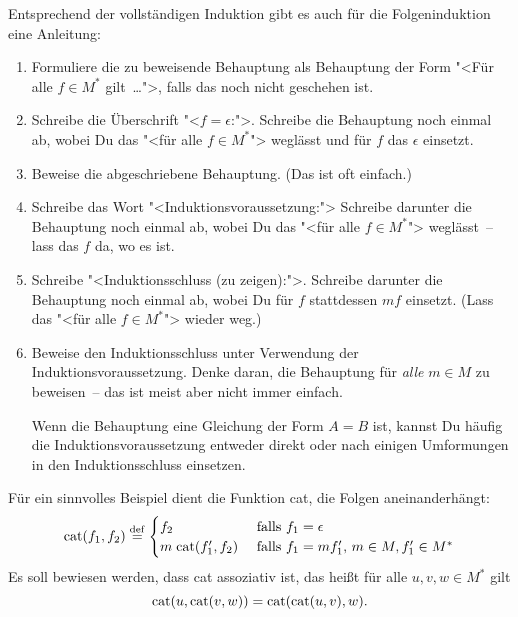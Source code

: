 Entsprechend der vollständigen Induktion gibt es auch für die
Folgeninduktion eine Anleitung:
%
\begin{enumerate}
\item Formuliere die zu beweisende Behauptung als Behauptung der
  Form "<Für alle $f\in M^\ast$ gilt~\ldots">, falls das noch nicht
  geschehen ist.
\item Schreibe die Überschrift "<$f = \epsilon$:">. Schreibe die
  Behauptung noch einmal ab, wobei Du das "<für alle $f\in M^\ast$"> weglässt und für $f$ das $\epsilon$ einsetzt.
\item Beweise die abgeschriebene Behauptung.  (Das ist oft
  einfach.)
\item Schreibe das Wort "<Induktionsvoraussetzung:"> Schreibe
  darunter die Behauptung noch einmal ab, wobei Du das "<für
  alle $f\in M^\ast$"> weglässt~-- lass das $f$ da, wo es ist.
\item Schreibe "<Induktionsschluss (zu zeigen):">.
  Schreibe darunter die Behauptung noch einmal ab, wobei Du für
  $f$ stattdessen $mf$ einsetzt.  (Lass das "<für alle
  $f\in M^\ast$"> wieder weg.)
\item Beweise den Induktionsschluss unter Verwendung der
  Induktionsvoraussetzung.  Denke daran, die Behauptung für
  \emph{alle} $m\in M$ zu beweisen~-- das ist meist aber nicht immer
  einfach.

  Wenn die Behauptung eine Gleichung der Form $A = B$ ist, kannst
  Du häufig die Induktionsvoraussetzung entweder direkt oder nach
  einigen Umformungen in den Induktionsschluss einsetzen.
\end{enumerate}
%
Für ein sinnvolles Beispiel dient die Funktion cat, die Folgen
aneinanderhängt:
%
\begin{displaymath}
  \textrm{cat}(f_1, f_2)
  \stackrel{\rm def}{=}
  \begin{cases}
    f_2 & \textrm{ falls $f_1 = \epsilon$}\\
    m\;\textrm{cat}(f_1', f_2)& \textrm{ falls $f_1 = mf_1'$, $m\in M, f_1'\in M^\ast$}
  \end{cases}
\end{displaymath}
Es soll bewiesen werden, dass cat assoziativ\label{Assoziativität}\label{page:assoziativitaet} ist, das heißt für alle 
$u,v,w \in M^{\ast}$ gilt
\begin{displaymath}
  {\rm cat}(u,{\rm cat}(v,w))  = {\rm cat}({\rm cat}(u,v),w).
\end{displaymath}
% 
